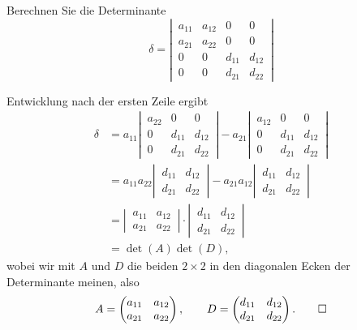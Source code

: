 Berechnen Sie die Determinante
\[
\delta=\left|\,
\begin{matrix}
a_{11}&a_{12}&0     &0     \\
a_{21}&a_{22}&0     &0     \\
0     &0     &d_{11}&d_{12}\\
0     &0     &d_{21}&d_{22}
\end{matrix}
\,\right|
\]

\begin{loesung}
Entwicklung nach der ersten Zeile ergibt
\begin{align*}
\delta
&=
a_{11}\left|\,
\begin{matrix}
a_{22}&0     &0     \\
0     &d_{11}&d_{12}\\
0     &d_{21}&d_{22}
\end{matrix}
\,\right|
-
a_{21}
\left|\,
\begin{matrix}
a_{12}&0     &0     \\
0     &d_{11}&d_{12}\\
0     &d_{21}&d_{22}
\end{matrix}
\,\right|
\\
&=
a_{11}a_{22}\left|\,
\begin{matrix}
d_{11}&d_{12}\\
d_{21}&d_{22}
\end{matrix}
\,\right|
-
a_{21}a_{12}
\left|\,
\begin{matrix}
d_{11}&d_{12}\\
d_{21}&d_{22}
\end{matrix}
\,\right|
\\
&=
\left|\,
\begin{matrix}
a_{11}&a_{12}\\
a_{21}&a_{22}
\end{matrix}
\,\right|
\cdot
\left|\,
\begin{matrix}
d_{11}&d_{12}\\
d_{21}&d_{22}
\end{matrix}
\,\right|
\\
&=\det(A)\det(D),
\end{align*}
wobei wir mit $A$ und $D$ die beiden $2\times 2$ in den diagonalen Ecken
der Determinante meinen, also
\[
A=\begin{pmatrix}
a_{11}&a_{12}\\a_{21}&a_{22}
\end{pmatrix},\qquad
D=\begin{pmatrix}
d_{11}&d_{12}\\d_{21}&d_{22}
\end{pmatrix}.
\qedhere
\]
\end{loesung}

